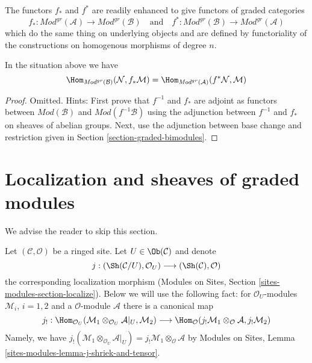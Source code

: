 \medskip\noindent
The functors $f_*$ and $f^*$ are readily enhanced to give
functors of graded categories
$$
f_* :
\textit{Mod}^{gr}(\mathcal{A})
\longrightarrow
\textit{Mod}^{gr}(\mathcal{B})
\quad\text{and}\quad
f^* :
\textit{Mod}^{gr}(\mathcal{B})
\longrightarrow
\textit{Mod}^{gr}(\mathcal{A})
$$
which do the same thing on underlying objects and are defined
by functoriality of the constructions on homogenous morphisms
of degree $n$.

\begin{lemma}
\label{lemma-adjunction-push-pull-gr}
In the situation above we have
$$
\Hom_{\textit{Mod}^{gr}(\mathcal{B})}(
\mathcal{N}, f_*\mathcal{M}) =
\Hom_{\textit{Mod}^{gr}(\mathcal{A})}(
f^*\mathcal{N}, \mathcal{M})
$$
\end{lemma}

\begin{proof}
Omitted. Hints: First prove that $f^{-1}$ and $f_*$ are adjoint
as functors between $\textit{Mod}(\mathcal{B})$ and
$\textit{Mod}(f^{-1}\mathcal{B})$ using the adjunction between
$f^{-1}$ and $f_*$ on sheaves of abelian groups.
Next, use the adjunction between base change and restriction
given in Section \ref{section-graded-bimodules}.
\end{proof}





\section{Localization and sheaves of graded modules}
\label{section-localize-graded}

\noindent
We advise the reader to skip this section.

\medskip\noindent
Let $(\mathcal{C}, \mathcal{O})$ be a ringed site.
Let $U \in \Ob(\mathcal{C})$ and denote
$$
j :
(\Sh(\mathcal{C}/U), \mathcal{O}_U)
\longrightarrow
(\Sh(\mathcal{C}), \mathcal{O})
$$
the corresponding localization morphism
(Modules on Sites, Section \ref{sites-modules-section-localize}).
Below we will use the following fact: for $\mathcal{O}_U$-modules
$\mathcal{M}_i$, $i = 1, 2$ and a $\mathcal{O}$-module $\mathcal{A}$
there is a canonical map
$$
j_! :
\Hom_{\mathcal{O}_U}(
\mathcal{M}_1 \otimes_{\mathcal{O}_U} \mathcal{A}|_U, \mathcal{M}_2)
\longrightarrow
\Hom_\mathcal{O}(
j_!\mathcal{M}_1 \otimes_\mathcal{O} \mathcal{A}, j_!\mathcal{M}_2)
$$
Namely, we have
$j_!(\mathcal{M}_1 \otimes_{\mathcal{O}_U} \mathcal{A}|_U) =
j_!\mathcal{M}_1 \otimes_\mathcal{O} \mathcal{A}$ by
Modules on Sites, Lemma \ref{sites-modules-lemma-j-shriek-and-tensor}.


